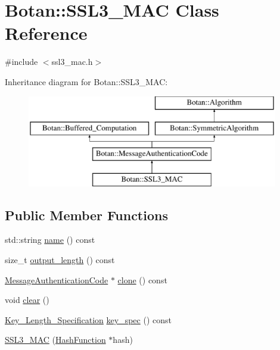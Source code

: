 \hypertarget{classBotan_1_1SSL3__MAC}{\section{Botan\-:\-:S\-S\-L3\-\_\-\-M\-A\-C Class Reference}
\label{classBotan_1_1SSL3__MAC}
}


{\ttfamily \#include $<$ssl3\-\_\-mac.\-h$>$}

Inheritance diagram for Botan\-:\-:S\-S\-L3\-\_\-\-M\-A\-C\-:\begin{figure}[H]
\begin{center}
\leavevmode
\includegraphics[height=4.000000cm]{classBotan_1_1SSL3__MAC}
\end{center}
\end{figure}
\subsection*{Public Member Functions}
\begin{DoxyCompactItemize}
\item 
std\-::string \hyperlink{classBotan_1_1SSL3__MAC_aba5b648fefb35c752b8765064be6576d}{name} () const 
\item 
size\-\_\-t \hyperlink{classBotan_1_1SSL3__MAC_a9d2211af680fe4eaaa7944d322ec9eae}{output\-\_\-length} () const 
\item 
\hyperlink{classBotan_1_1MessageAuthenticationCode}{Message\-Authentication\-Code} $\ast$ \hyperlink{classBotan_1_1SSL3__MAC_a195a02ee9068a8653c1d7e3b0aea5fc6}{clone} () const 
\item 
void \hyperlink{classBotan_1_1SSL3__MAC_aa5005464a925976b37d2e3386897dfdb}{clear} ()
\item 
\hyperlink{classBotan_1_1Key__Length__Specification}{Key\-\_\-\-Length\-\_\-\-Specification} \hyperlink{classBotan_1_1SSL3__MAC_a00dce7e8c85ee32d3fa1a5f443173ab2}{key\-\_\-spec} () const 
\item 
\hyperlink{classBotan_1_1SSL3__MAC_a217603163e5181cb291d2a00f14ed147}{S\-S\-L3\-\_\-\-M\-A\-C} (\hyperlink{classBotan_1_1HashFunction}{Hash\-Function} $\ast$hash)
\end{DoxyCompactItemize}


